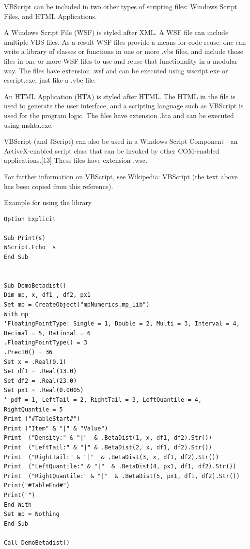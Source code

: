 \vpara
VBScript can be included in two other types of scripting files: Windows Script Files, and HTML Applications.

\vpara
A Windows Script File (WSF) is styled after XML. A WSF file can include multiple VBS files. As a result WSF files provide a means for code reuse: one can write a library of classes or functions in one or more .vbs files, and include those files in one or more WSF files to use and reuse that functionality in a modular way. The files have extension .wsf and can be executed using wscript.exe or cscript.exe, just like a .vbe file.

\vpara
An HTML Application (HTA) is styled after HTML. The HTML in the file is used to generate the user interface, and a scripting language such as VBScript is used for the program logic. The files have extension .hta and can be executed using mshta.exe.

\vpara
VBScript (and JScript) can also be used in a Windows Script Component - an ActiveX-enabled script class that can be invoked by other COM-enabled applications.[13] These files have extension .wsc.

For further information on VBScript, see \href{http://en.wikipedia.org/wiki/VBScript}{Wikipedia: VBScript} (the text above has been copied from this reference).

\vpara
\noindent Example for using the library

\begin{lstlisting}
Option Explicit

Sub Print(s)
WScript.Echo  s
End Sub


Sub DemoBetadist()
Dim mp, x, df1 , df2, px1 
Set mp = CreateObject("mpNumerics.mp_Lib")
With mp
'FloatingPointType: Single = 1, Double = 2, Multi = 3, Interval = 4, Decimal = 5, Rational = 6
.FloatingPointType() = 3
.Prec10() = 36
Set x = .Real(0.1)
Set df1 = .Real(13.0)
Set df2 = .Real(23.0)
Set px1 = .Real(0.0005)	
' pdf = 1, LeftTail = 2, RightTail = 3, LeftQuantile = 4, RightQuantile = 5
Print ("#TableStart#")
Print ("Item" & "|" & "Value")
Print  ("Density:" & "|"  & .BetaDist(1, x, df1, df2).Str())
Print  ("LeftTail:" & "|" & .BetaDist(2, x, df1, df2).Str())
Print  ("RightTail:" & "|"  & .BetaDist(3, x, df1, df2).Str())
Print  ("LeftQuantile:" & "|"  & .BetaDist(4, px1, df1, df2).Str())
Print  ("RightQuantile:" & "|"  & .BetaDist(5, px1, df1, df2).Str())
Print("#TableEnd#")
Print("")
End With
Set mp = Nothing
End Sub

Call DemoBetadist()
\end{lstlisting}


